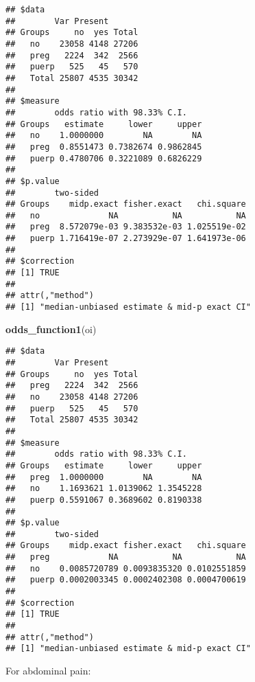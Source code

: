 \documentclass[
]{article}
\newenvironment{Shaded}{\begin{snugshade}}{\end{snugshade}}
\newcommand{\DataTypeTok}[1]{\textcolor[rgb]{0.13,0.29,0.53}{#1}}
\newcommand{\KeywordTok}[1]{\textcolor[rgb]{0.13,0.29,0.53}{\textbf{#1}}}
\newcommand{\NormalTok}[1]{#1}
\newcommand{\OperatorTok}[1]{\textcolor[rgb]{0.81,0.36,0.00}{\textbf{#1}}}
\newcommand{\OtherTok}[1]{\textcolor[rgb]{0.56,0.35,0.01}{#1}}
\newcommand{\StringTok}[1]{\textcolor[rgb]{0.31,0.60,0.02}{#1}}
\begin{document}
\begin{verbatim}
## $data
##        Var Present
## Groups     no  yes Total
##   no    23058 4148 27206
##   preg   2224  342  2566
##   puerp   525   45   570
##   Total 25807 4535 30342
## 
## $measure
##        odds ratio with 98.33% C.I.
## Groups   estimate     lower     upper
##   no    1.0000000        NA        NA
##   preg  0.8551473 0.7382674 0.9862845
##   puerp 0.4780706 0.3221089 0.6826229
## 
## $p.value
##        two-sided
## Groups    midp.exact fisher.exact   chi.square
##   no              NA           NA           NA
##   preg  8.572079e-03 9.383532e-03 1.025519e-02
##   puerp 1.716419e-07 2.273929e-07 1.641973e-06
## 
## $correction
## [1] TRUE
## 
## attr(,"method")
## [1] "median-unbiased estimate & mid-p exact CI"
\end{verbatim}

\begin{Shaded}
\begin{Highlighting}[]
\KeywordTok{odds_function1}\NormalTok{(oi)}
\end{Highlighting}
\end{Shaded}

\begin{verbatim}
## $data
##        Var Present
## Groups     no  yes Total
##   preg   2224  342  2566
##   no    23058 4148 27206
##   puerp   525   45   570
##   Total 25807 4535 30342
## 
## $measure
##        odds ratio with 98.33% C.I.
## Groups   estimate     lower     upper
##   preg  1.0000000        NA        NA
##   no    1.1693621 1.0139062 1.3545228
##   puerp 0.5591067 0.3689602 0.8190338
## 
## $p.value
##        two-sided
## Groups    midp.exact fisher.exact   chi.square
##   preg            NA           NA           NA
##   no    0.0085720789 0.0093835320 0.0102551859
##   puerp 0.0002003345 0.0002402308 0.0004700619
## 
## $correction
## [1] TRUE
## 
## attr(,"method")
## [1] "median-unbiased estimate & mid-p exact CI"
\end{verbatim}

For abdominal pain:

\begin{Shaded}
\end{Shaded}
\end{document}
